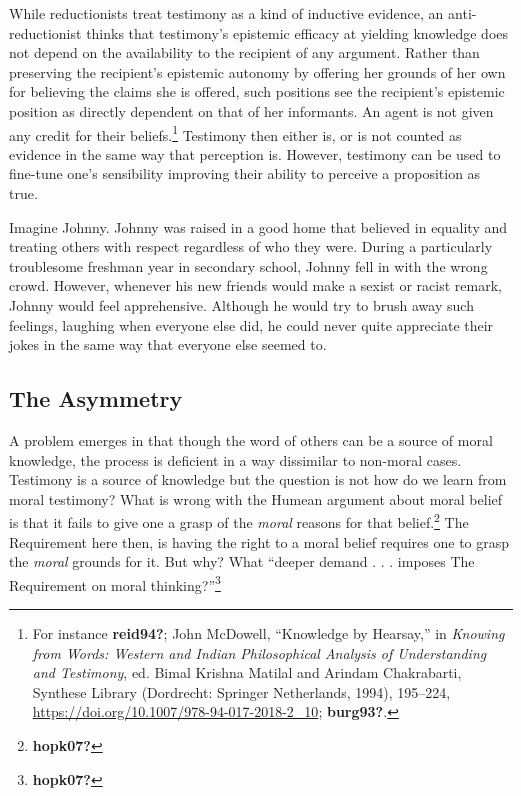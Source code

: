 \documentclass[
  12pt,
]{book}
\theoremstyle{definition}
\theoremstyle{definition}
\theoremstyle{definition}
\theoremstyle{definition}
\theoremstyle{remark}
\begin{document}
While reductionists treat testimony as a kind of inductive evidence, an anti-reductionist thinks that testimony's epistemic efficacy at yielding knowledge does not depend on the availability to the recipient of any argument. Rather than preserving the recipient's epistemic autonomy by offering her grounds of her own for believing the claims she is offered, such positions see the recipient's epistemic position as directly dependent on that of her informants. An agent is not given any credit for their beliefs.\footnote{For instance \textbf{reid94?}; John McDowell, {``Knowledge by {Hearsay},''} in \emph{Knowing from {Words}: {Western} and {Indian Philosophical Analysis} of {Understanding} and {Testimony}}, ed. Bimal Krishna Matilal and Arindam Chakrabarti, Synthese {Library} (Dordrecht: Springer Netherlands, 1994), 195--224, \url{https://doi.org/10.1007/978-94-017-2018-2_10}; \textbf{burg93?}.} Testimony then either is, or is not counted as evidence in the same way that perception is. However, testimony can be used to fine-tune one's sensibility improving their ability to perceive a proposition as true.

Imagine Johnny. Johnny was raised in a good home that believed in equality and treating others with respect regardless of who they were. During a particularly troublesome freshman year in secondary school, Johnny fell in with the wrong crowd. However, whenever his new friends would make a sexist or racist remark, Johnny would feel apprehensive. Although he would try to brush away such feelings, laughing when everyone else did, he could never quite appreciate their jokes in the same way that everyone else seemed to.

\subsection*{The Asymmetry}\label{the-asymmetry}

A problem emerges in that though the word of others can be a source of moral knowledge, the process is deficient in a way dissimilar to non-moral cases. Testimony is a source of knowledge but the question is not how do we learn from moral testimony? What is wrong with the Humean argument about moral belief is that it fails to give one a grasp of the \emph{moral} reasons for that belief.\footnote{\textbf{hopk07?}} The Requirement here then, is having the right to a moral belief requires one to grasp the \emph{moral} grounds for it. But why? What ``deeper demand . . . imposes The Requirement on moral thinking?''\footnote{\textbf{hopk07?}}
\end{document}
